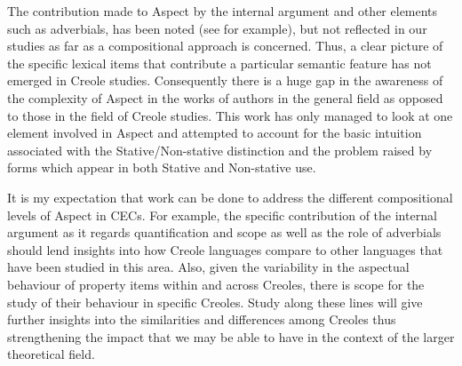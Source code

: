 The contribution made to Aspect by the internal argument and other elements such as adverbials, has been noted (see \citealt{Jaganauth1987} for example), but not reflected in our studies as far as a compositional approach is concerned. Thus, a clear picture of the specific lexical items that contribute a particular semantic feature has not emerged in Creole studies. Consequently there is a huge gap in the awareness of the complexity of Aspect in the works of authors in the general field as opposed to those in the field of Creole studies. This work has only managed to look at one element involved in Aspect and attempted to account for the basic intuition associated with the Stative\slash Non-stative distinction and the problem raised by forms which appear in both Stative and Non-stative use. 

It is my expectation that work can be done to address the different compositional levels of Aspect in CECs. For example, the specific contribution of the internal argument as it regards quantification and scope as well as the role of adverbials should lend insights into how Creole languages compare to other languages that have been studied in this area. Also, given the variability in the aspectual behaviour of property items within and across Creoles, there is scope for the study of their behaviour in specific Creoles. Study along these lines will give further insights into the similarities and differences among Creoles thus strengthening the impact that we may be able to have in the context of the larger theoretical field.
